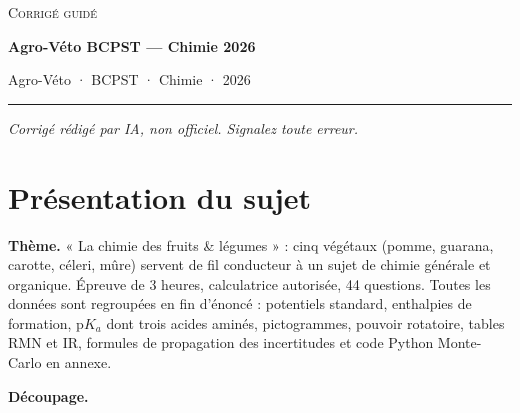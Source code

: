\documentclass[11pt,a4paper]{article}
\begin{document}
\thispagestyle{plain}
\begin{center}
  {\small\scshape Corrigé guidé}\par\smallskip
  {\LARGE\bfseries Agro-Véto BCPST — Chimie 2026\par}\medskip
  {\large Agro-Véto · BCPST · Chimie · 2026\par}
\end{center}
\vspace{2pt}\hrule\vspace{8pt}

\emph{Corrigé rédigé par IA, non officiel. Signalez toute erreur.}

\hypertarget{pruxe9sentation-du-sujet}{%
\section{Présentation du sujet}\label{pruxe9sentation-du-sujet}}

\textbf{Thème.} « La chimie des fruits \& légumes » : cinq végétaux (pomme, guarana, carotte, céleri, mûre) servent de fil conducteur à un sujet de chimie générale et organique. Épreuve de 3 heures, calculatrice autorisée, 44 questions. Toutes les données sont regroupées en fin d'énoncé : potentiels standard, enthalpies de formation, p\(K_a\) dont trois acides aminés, pictogrammes, pouvoir rotatoire, tables RMN et IR, formules de propagation des incertitudes et code Python Monte-Carlo en annexe.

\textbf{Découpage.}
\end{document}
